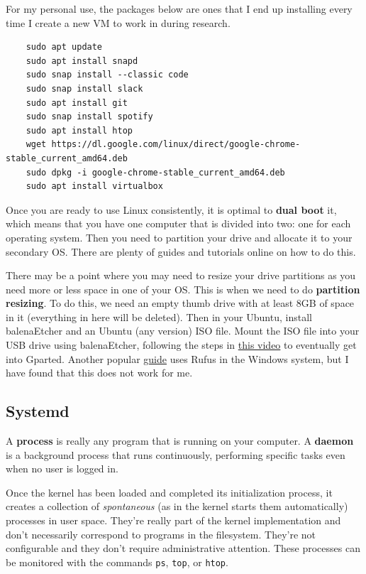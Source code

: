   For my personal use, the packages below are ones that I end up installing every time I create a new VM to work in during research. 

  \begin{lstlisting}
    sudo apt update
    sudo apt install snapd
    sudo snap install --classic code
    sudo snap install slack
    sudo apt install git 
    sudo snap install spotify 
    sudo apt install htop
    wget https://dl.google.com/linux/direct/google-chrome-stable_current_amd64.deb
    sudo dpkg -i google-chrome-stable_current_amd64.deb
    sudo apt install virtualbox 
  \end{lstlisting}

  Once you are ready to use Linux consistently, it is optimal to \textbf{dual boot} it, which means that you have one computer that is divided into two: one for each operating system. Then you need to partition your drive and allocate it to your secondary OS. There are plenty of guides and tutorials online on how to do this. 

  There may be a point where you may need to resize your drive partitions as you need more or less space in one of your OS. This is when we need to do \textbf{partition resizing}. To do this, we need an empty thumb drive with at least 8GB of space in it (everything in here will be deleted). Then in your Ubuntu, install balenaEtcher and an Ubuntu (any version) ISO file. Mount the ISO file into your USB drive using balenaEtcher, following the steps in \href{https://www.youtube.com/watch?v=Kyz9x71gEPI&t=504s}{this video} to eventually get into Gparted. Another popular \href{https://www.youtube.com/watch?v=vlVXPtJ20hA&t=467s}{guide} uses Rufus in the Windows system, but I have found that this does not work for me. 

\subsection{Systemd} 

  A \textbf{process} is really any program that is running on your computer. A \textbf{daemon} is a background process that runs continuously, performing specific tasks even when no user is logged in. 

  Once the kernel has been loaded and completed its initialization process, it creates a collection of \textit{spontaneous} (as in the kernel starts them automatically) processes in user space. They're really part of the kernel implementation and don't necessarily correspond to programs in the filesystem. They're not configurable and they don't require administrative attention. These processes can be monitored with the commands \texttt{ps}, \texttt{top}, or \texttt{htop}.

